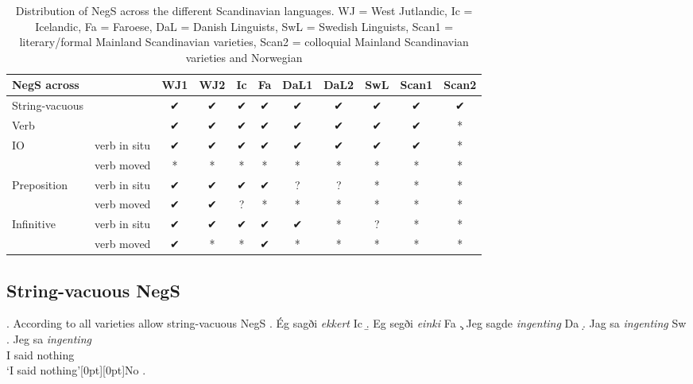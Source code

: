 \documentclass[12pt, letterpaper]{article}
\newcommand{\rcommentg}[1]{\hfill\raisebox{1.9\baselineskip}[0pt][0pt]{#1}} %
\begin{document}
\begin{table}[h!]
	\centering
	\caption{Distribution of NegS across the different Scandinavian languages. WJ = West Jutlandic, Ic = Icelandic, Fa = Faroese, DaL = Danish Linguists, SwL = Swedish Linguists, Scan1 = literary/formal Mainland Scandinavian varieties, Scan2 = colloquial Mainland Scandinavian varieties and Norwegian}
\begin{tabular}{llccccccccc}
	\hline 
	NegS across &  & WJ1 & WJ2 & Ic & Fa & DaL1 & DaL2 & SwL & Scan1 & Scan2 \\ 
	\hline 
	String-vacuous &  & ✔︎ & ✔︎ & ✔︎ & ✔︎ & ✔︎ & ✔︎ & ✔︎ & ✔︎ & ✔︎ \\ 
	Verb &  & ✔︎ & ✔︎ & ✔︎ & ✔︎ & ✔︎ & ✔︎ & ✔︎ & ✔︎ & * \\ 
	IO & verb in situ & ✔︎ & ✔︎ & ✔︎ & ✔︎ & ✔︎ & ✔︎ & ✔︎ & ✔︎ & * \\ 
	& verb moved & * & * & * & * & * & * & * & * & * \\ 
	Preposition & verb in situ & ✔︎ & ✔︎ & ✔︎ & ✔︎ & ? & ? & * & * & * \\ 
	& verb moved & ✔︎ & ✔︎ & ? & * & * & * & * & * & * \\ 
	Infinitive & verb in situ & ✔︎ & ✔︎ & ✔︎ & ✔︎ & ✔︎ & * & ? & * & * \\ 
	& verb moved & ✔︎ & * & * & ✔︎ & * & * & * & * & * \\ 
	\hline 
\end{tabular} 
\end{table}

\subsection{String-vacuous NegS}

\ex. According to \citeauthor{engelsScandinavianNegativeIndefinites2012} all varieties allow string-vacuous NegS
\a. Ég sagði \textit{ekkert} \hfill Ic
\b. Eg segði \textit{einki} \hfill Fa
\c. Jeg sagde \textit{ingenting} \hfill Da
\d. Jag sa \textit{ingenting} \hfill Sw
\eg. Jeg sa \textit{ingenting} \\
I said nothing\\
`I said nothing'\rcommentg{No}
\z.

\end{document}
